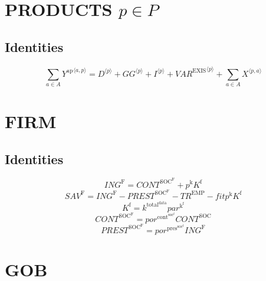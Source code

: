 \section{PRODUCTS $p\in P$}

\subsection{Identities}

\begin{equation}
\sum_{a\in A} {Y^{\mathrm{ap}}}^{\langle a,p\rangle} = {D}^{\langle p\rangle} + {{G\!G}}^{\langle p\rangle} + {I}^{\langle p\rangle} + {{V\!A\!R}^{\mathrm{EXIS}}}^{\langle p\rangle} + \sum_{a\in A} {X}^{\langle p,a\rangle}
\end{equation}




\section{FIRM}

\subsection{Identities}

\begin{equation}
{I\!N\!G}^{\mathrm{F}} = {C\!O\!N\!T}^{\mathrm{SOC}^{\mathrm{F}}} + {p^{\mathrm{k}}} {K^{\mathrm{f}}}
\end{equation}
\begin{equation}
{S\!A\!V}^{\mathrm{F}} = {I\!N\!G}^{\mathrm{F}} - {P\!R\!E\!S\!T}^{\mathrm{SOC}^{\mathrm{F}}} - {T\!R}^{\mathrm{EMP}} - {{f\!i\!t}} {p^{\mathrm{k}}} {K^{\mathrm{f}}}
\end{equation}
\begin{equation}
K^{\mathrm{f}} = {k^{\mathrm{total}^{\mathrm{data}}}} {{p\!a\!r}^{\mathrm{k}^{\mathrm{f}}}}
\end{equation}
\begin{equation}
{C\!O\!N\!T}^{\mathrm{SOC}^{\mathrm{F}}} = {{p\!o\!r}^{\mathrm{cont}^{\mathrm{soc}^{\mathrm{f}}}}} {{C\!O\!N\!T}^{\mathrm{SOC}}}
\end{equation}
\begin{equation}
{P\!R\!E\!S\!T}^{\mathrm{SOC}^{\mathrm{F}}} = {{p\!o\!r}^{\mathrm{pres}^{\mathrm{soc}^{\mathrm{f}}}}} {{I\!N\!G}^{\mathrm{F}}}
\end{equation}




\section{GOB}

